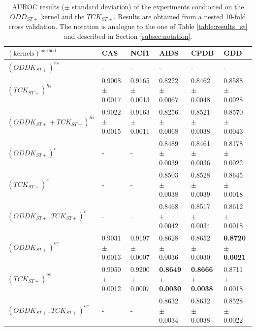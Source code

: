 \begin{landscape}
\begin{table}[ht]
        \begin{tabular}{|l|l|l|l|l|l|}
            \hline
            $\mathrm{(kernels)^{method}}$&CAS&NCI1&AIDS&CPDB&GDD\\
            \hline
            $(ODDK_{ST+})^{hs}$&-&-&-&-&-\\
            $(TCK_{ST+})^{hs}$&0.9008 $\pm$ 0.0017&0.9165 $\pm$ 0.0013&0.8222 $\pm$ 0.0067&0.8462 $\pm$ 0.0048&0.8588 $\pm$ 0.0028\\
            $(ODDK_{ST+} + TCK_{ST+})^{hs}$&0.9022 $\pm$ 0.0015 &0.9163 $\pm$ 0.0011&0.8256 $\pm$ 0.0068&0.8521 $\pm$ 0.0038&0.8570 $\pm$ 0.0043\\
            \hline
            $(ODDK_{ST+})^c$&-&-&0.8489 $\pm$  0.0039&0.8461 $\pm$ 0.0036&0.8178 $\pm$ 0.0022\\
            $(TCK_{ST+})^c$&-&-&0.8503 $\pm$  0.0038&0.8528 $\pm$ 0.0039&0.8645 $\pm$ 0.0018\\
            $(ODDK_{ST+}, TCK_{ST+})^c$&-&-&0.8468 $\pm$ 0.0042&0.8517 $\pm$ 0.0034&0.8612 $\pm$ 0.0018\\
            \hline
            $(ODDK_{ST+})^{oc}$&0.9031 $\pm$ 0.0013&0.9197 $\pm$ 0.0007&0.8628 $\pm$  0.0036&0.8652 $\pm$ 0.0030&\textbf{0.8720 $\pm$ 0.0021}\\
            $(TCK_{ST+})^{oc}$&0.9050 $\pm$ 0.0012&0.9200 $\pm$ 0.0007&\textbf{0.8649 $\pm$  0.0030}&\textbf{0.8666 $\pm$  0.0038}&0.8711 $\pm$ 0.0018 \\
            $(ODDK_{ST+}, TCK_{ST+})^{oc}$&-&-&0.8632 $\pm$  0.0034&0.8632 $\pm$  0.0038&0.8528 $\pm$ 0.0022\\
            \hline
        \end{tabular}
        \caption{AUROC results ($\pm$ standard deviation) of the experiments conducted on
                the $ODD_{ST+}$ kernel and the $TCK_{ST+}$. Results are
                obtained from a nested 10-fold cross validation.
                The notation is analogue to the one of Table \ref{table:results_st} and described in Section \ref{subsec:notation}.}
        \label{table:results_stp}
    \end{table}


\end{landscape}
